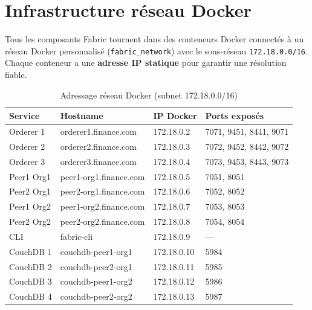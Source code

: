 \documentclass[12pt,a4paper,twoside]{report}
\begin{document}
\section{Infrastructure réseau Docker}

Tous les composants Fabric tournent dans des conteneurs Docker connectés à un réseau Docker personnalisé (\texttt{fabric\_network}) avec le sous-réseau \texttt{172.18.0.0/16}. Chaque conteneur a une \textbf{adresse IP statique} pour garantir une résolution fiable.

\begin{table}[H]
\centering
\begin{tabularx}{\textwidth}{llll}
\toprule
\textbf{Service} & \textbf{Hostname} & \textbf{IP Docker} & \textbf{Ports exposés} \\
\midrule
Orderer 1 & orderer1.finance.com & 172.18.0.2 & 7071, 9451, 8441, 9071 \\
Orderer 2 & orderer2.finance.com & 172.18.0.3 & 7072, 9452, 8442, 9072 \\
Orderer 3 & orderer3.finance.com & 172.18.0.4 & 7073, 9453, 8443, 9073 \\
Peer1 Org1 & peer1-org1.finance.com & 172.18.0.5 & 7051, 8051 \\
Peer2 Org1 & peer2-org1.finance.com & 172.18.0.6 & 7052, 8052 \\
Peer1 Org2 & peer1-org2.finance.com & 172.18.0.7 & 7053, 8053 \\
Peer2 Org2 & peer2-org2.finance.com & 172.18.0.8 & 7054, 8054 \\
CLI & fabric-cli & 172.18.0.9 & --- \\
CouchDB 1 & couchdb-peer1-org1 & 172.18.0.10 & 5984 \\
CouchDB 2 & couchdb-peer2-org1 & 172.18.0.11 & 5985 \\
CouchDB 3 & couchdb-peer1-org2 & 172.18.0.12 & 5986 \\
CouchDB 4 & couchdb-peer2-org2 & 172.18.0.13 & 5987 \\
\bottomrule
\end{tabularx}
\caption{Adressage réseau Docker (subnet 172.18.0.0/16)}
\end{table}
\end{document}
